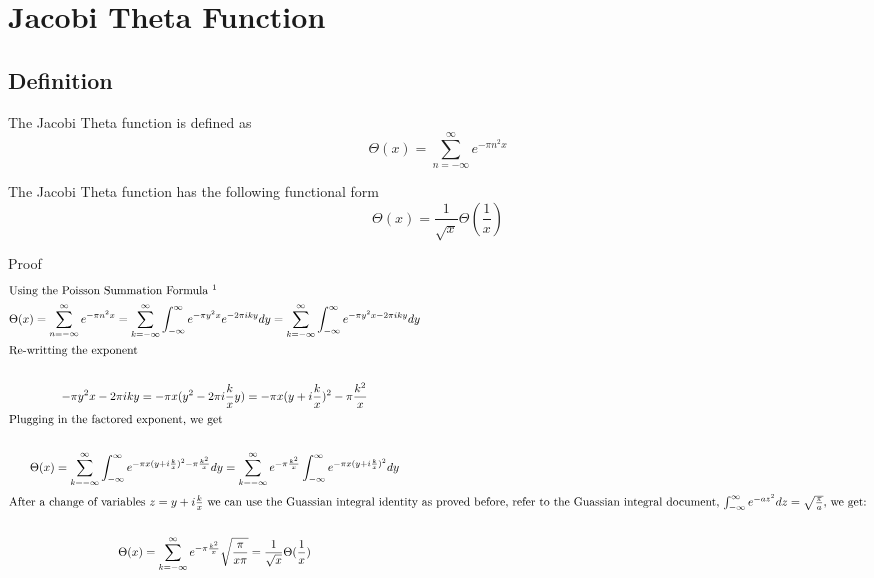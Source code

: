 \documentclass[a4paper]{article}
\begin{document}
\pagebreak

\section{Jacobi Theta Function}

\subsection{Definition}
\begin{definition}\label{zf:Jacobi Theta def}
The Jacobi Theta function is defined as 
$$
\Theta(x) = \sum_{n=-\infty}^{\infty} e^{- \pi n^2 x}
$$
\end{definition}

\begin{theorem}
The Jacobi Theta function has the following functional form
\begin{equation} \label{zf:Jacobi functional form}
\Theta(x) = \frac{1}{\sqrt{x}} \Theta(\frac{1}{x})
\end{equation}

Proof
\begin{gather*}
\intertext{Using the Poisson Summation Formula \footnotemark}
\Theta(x) = \sum_{n=-\infty}^{\infty} e^{- \pi n^2 x} = \sum_{k=-\infty}^{\infty} 
\int_{-\infty}^{\infty}
e^{- \pi y^2 x} e^{-2 \pi i k y} dy 
=
\sum_{k=-\infty}^{\infty} 
\int_{-\infty}^{\infty}
e^{- \pi y^2 x -2 \pi i k y} dy 
\\
\intertext{Re-writting the exponent}
\\ 
- \pi y^2 x -2 \pi i k y 
= - \pi x (y^2 -2 \pi i \frac{k}{x} y)
= - \pi x (y + i \frac{k}{x})^2 - \pi \frac{k^2}{x}
\\
\intertext{Plugging in the factored exponent, we get}
\\
\Theta(x) 
=
\sum_{k=-\infty}^{\infty} 
\int_{-\infty}^{\infty}
e^{- \pi x (y + i \frac{k}{x})^2 - \pi \frac{k^2}{x}} dy 
=
\sum_{k=-\infty}^{\infty}
e^{- \pi \frac{k^2}{x}} 
\int_{-\infty}^{\infty}
e^{- \pi x (y + i \frac{k}{x})^2} dy
\\
\intertext{After a change of variables $z = y + i \frac{k}{x}$ we can use the Guassian integral identity as proved before, refer to the Guassian integral document, $\int_{-\infty}^{\infty}
e^{- a z^2 } dz = \sqrt{\frac{\pi}{a}} $, we get:}
\\ 
\Theta(x) 
=
\sum_{k=-\infty}^{\infty}
e^{- \pi \frac{k^2}{x}} 
\sqrt{\frac{\pi}{x \pi}}
= \frac{1}{\sqrt{x}} \Theta(\frac{1}{x}) 
\end{gather*}
\end{theorem}
\end{document}
